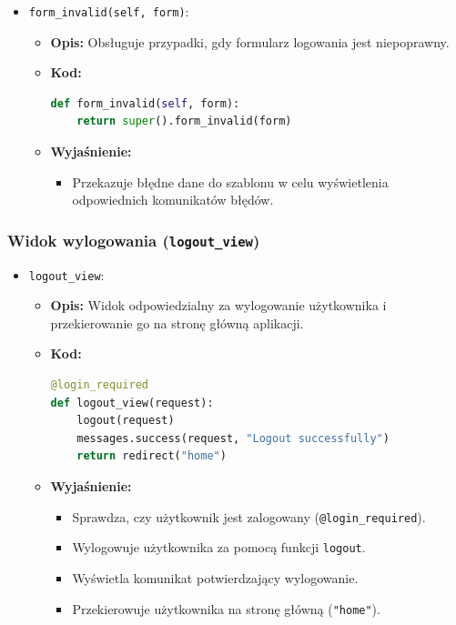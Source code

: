 \documentclass[12pt,a4paper,oneside]{article}
\theoremstyle{definition}
\numberwithin{equation}{section}
\begin{document}
\begin{itemize}
    \item \texttt{form\_invalid(self, form)}:
    \begin{itemize}
        \item \textbf{Opis:} Obsługuje przypadki, gdy formularz logowania jest niepoprawny.
        \item \textbf{Kod:}
        \begin{lstlisting}[language=Python, caption=Metoda form\_invalid w UserLoginView]
def form_invalid(self, form):
    return super().form_invalid(form)
        \end{lstlisting}
        \item \textbf{Wyjaśnienie:}
        \begin{itemize}
            \item Przekazuje błędne dane do szablonu w celu wyświetlenia odpowiednich komunikatów błędów.
        \end{itemize}
    \end{itemize}
\end{itemize}

\subsubsection*{Widok wylogowania (\texttt{logout\_view})}
\begin{itemize}
    \item \texttt{logout\_view}:
    \begin{itemize}
        \item \textbf{Opis:} Widok odpowiedzialny za wylogowanie użytkownika i przekierowanie go na stronę główną aplikacji.
        \item \textbf{Kod:}
        \begin{lstlisting}[language=Python, caption=Widok logout_view]
@login_required
def logout_view(request):
    logout(request)
    messages.success(request, "Logout successfully")
    return redirect("home")
        \end{lstlisting}
        \item \textbf{Wyjaśnienie:}
        \begin{itemize}
            \item Sprawdza, czy użytkownik jest zalogowany (\texttt{@login\_required}).
            \item Wylogowuje użytkownika za pomocą funkcji \texttt{logout}.
            \item Wyświetla komunikat potwierdzający wylogowanie.
            \item Przekierowuje użytkownika na stronę główną (\texttt{"home"}).
        \end{itemize}
    \end{itemize}
\end{itemize}
\end{document}
